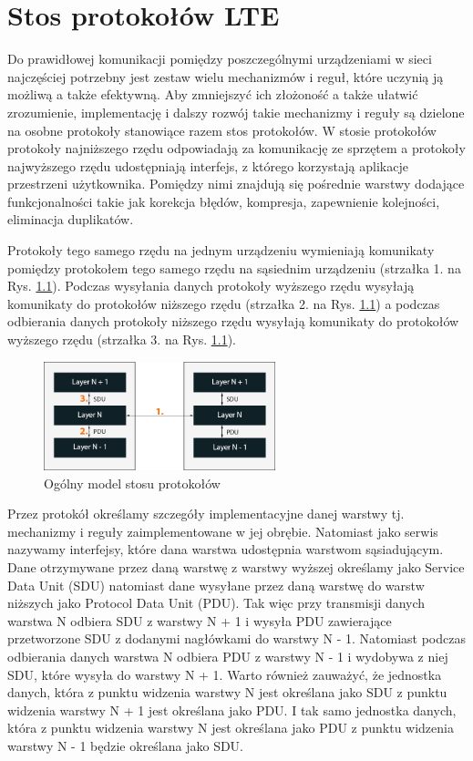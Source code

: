 \chapter{Stos protokołów LTE}
\label{cha:protokoly}

Do prawidłowej komunikacji pomiędzy poszczególnymi urządzeniami w sieci najczęściej potrzebny jest zestaw wielu mechanizmów i reguł, które uczynią ją możliwą a także efektywną. Aby zmniejszyć ich złożoność a także ułatwić zrozumienie, implementację i dalszy rozwój takie mechanizmy i reguły są dzielone na osobne protokoły stanowiące razem stos protokołów. W stosie protokołów protokoły najniższego rzędu odpowiadają za komunikację ze sprzętem a protokoły najwyższego rzędu udostępniają interfejs, z którego korzystają aplikacje przestrzeni użytkownika. Pomiędzy nimi znajdują się pośrednie warstwy dodające funkcjonalności takie jak korekcja błędów, kompresja, zapewnienie kolejności, eliminacja duplikatów.

Protokoły tego samego rzędu na jednym urządzeniu wymieniają komunikaty pomiędzy protokołem tego samego rzędu na sąsiednim urządzeniu (strzałka 1. na Rys. \ref{fig:protocols_stack}). Podczas wysyłania danych protokoły wyższego rzędu wysyłają komunikaty do protokołów niższego rzędu (strzałka 2. na Rys. \ref{fig:protocols_stack}) a podczas odbierania danych protokoły niższego rzędu wysyłają komunikaty do protokołów wyższego rzędu (strzałka 3. na Rys. \ref{fig:protocols_stack}). 

\begin{figure}
	\centerline{\includegraphics[width=0.6\textwidth]{images/protocols.png}}
	\caption{Ogólny model stosu protokołów}
	\label{fig:protocols_stack}
\end{figure}

Przez protokół określamy szczegóły implementacyjne danej warstwy tj. mechanizmy i reguły zaimplementowane w jej obrębie. Natomiast jako serwis nazywamy interfejsy, które dana warstwa udostępnia warstwom sąsiadującym. \cite{Ahm13} Dane otrzymywane przez daną warstwę z warstwy wyższej określamy jako Service Data Unit (SDU) natomiast dane wysyłane przez daną warstwę do warstw niższych jako Protocol Data Unit (PDU). 
Tak więc przy transmisji danych warstwa N odbiera SDU z warstwy N + 1 i wysyła PDU zawierające przetworzone SDU z dodanymi nagłówkami do warstwy N - 1. Natomiast podczas odbierania danych warstwa N odbiera PDU z warstwy N - 1 i wydobywa z niej SDU, które wysyła do warstwy N + 1. Warto również zauważyć, że jednostka danych, która z punktu widzenia warstwy N jest określana jako SDU z punktu widzenia warstwy N + 1 jest określana jako PDU. I tak samo jednostka danych, która z punktu widzenia warstwy N jest określana jako PDU z punktu widzenia warstwy N - 1 będzie określana jako SDU.

